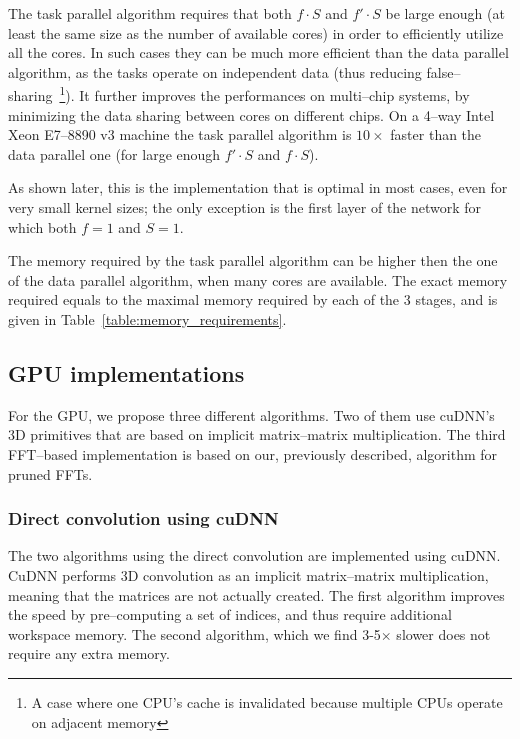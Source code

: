 \documentclass[conference]{./IEEEtran}
\begin{document}
  The task parallel algorithm requires that both $f \cdot S$ and $f'
  \cdot S$ be large enough (at least the same size as the number of
  available cores) in order to efficiently utilize all the cores.  In
  such cases they can be much more efficient than the data parallel
  algorithm, as the tasks operate on independent data (thus reducing
  false--sharing~\footnote{A case where one CPU's cache is invalidated
    because multiple CPUs operate on adjacent memory}).  It further
  improves the performances on multi--chip systems, by minimizing the
  data sharing between cores on different chips. On a 4--way Intel
  Xeon E7--8890 v3 machine the task parallel algorithm is $10 \times$
  faster than the data parallel one (for large enough $f' \cdot S$ and
  $f \cdot S$).

  As shown later, this is the implementation that is optimal in most
  cases, even for very small kernel sizes; the only exception is the
  first layer of the network for which both $f = 1$ and $S = 1$.

  The memory required by the task parallel algorithm can be higher
  then the one of the data parallel algorithm, when many cores are
  available.  The exact memory required equals to the maximal memory
  required by each of the 3 stages, and is given in
  Table~\ref{table:memory_requirements}.


\subsection{GPU implementations}

  For the GPU, we propose three different algorithms.  Two of them use
  cuDNN's 3D primitives that are based on implicit matrix--matrix
  multiplication.  The third FFT--based implementation is based on
  our, previously described, algorithm for pruned FFTs.

\subsubsection{Direct convolution using cuDNN}

  The two algorithms using the direct convolution are implemented
  using cuDNN.  CuDNN performs 3D convolution as an implicit
  matrix--matrix multiplication, meaning that the matrices are not
  actually created.  The first algorithm improves the speed by
  pre--computing a set of indices, and thus require additional
  workspace memory.  The second algorithm, which we find 3-5$\times$
  slower does not require any extra memory.
\end{document}
